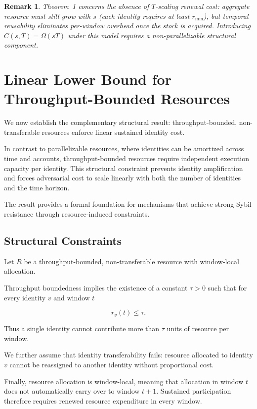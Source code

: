 \documentclass[journal]{IEEEtran}
\newtheorem{remark}{Remark}
\begin{document}
	\begin{remark}
		Theorem~1 concerns the absence of $T$-scaling renewal cost:
		aggregate resource must still grow with $s$ (each identity
		requires at least $r_{\min}$), but temporal reusability
		eliminates per-window overhead once the stock is acquired.
		Introducing $C(s,T)=\Omega(sT)$ under this model requires
		a non-parallelizable structural component.
	\end{remark}
	
	\section{Linear Lower Bound for Throughput-Bounded Resources}
	
	We now establish the complementary structural result:
	throughput-bounded, non-transferable resources
	enforce linear sustained identity cost.
	
	In contrast to parallelizable resources, where identities
	can be amortized across time and accounts,
	throughput-bounded resources require independent
	execution capacity per identity.
	This structural constraint prevents identity amplification
	and forces adversarial cost to scale linearly with both
	the number of identities and the time horizon.
	
	The result provides a formal foundation for mechanisms
	that achieve strong Sybil resistance through
	resource-induced constraints.
	
	\subsection{Structural Constraints}
	
	Let $R$ be a throughput-bounded, non-transferable resource
	with window-local allocation.
	
	Throughput boundedness implies the existence of a constant
	$\tau > 0$ such that for every identity $v$ and window $t$
	
	\[
	r_v(t) \le \tau .
	\]
	
	Thus a single identity cannot contribute
	more than $\tau$ units of resource per window.
	
	We further assume that identity transferability fails:
	resource allocated to identity $v$
	cannot be reassigned to another identity
	without proportional cost.
	
	Finally, resource allocation is window-local,
	meaning that allocation in window $t$
	does not automatically carry over to window $t+1$.
	Sustained participation therefore requires
	renewed resource expenditure in every window.
	
\end{document}
